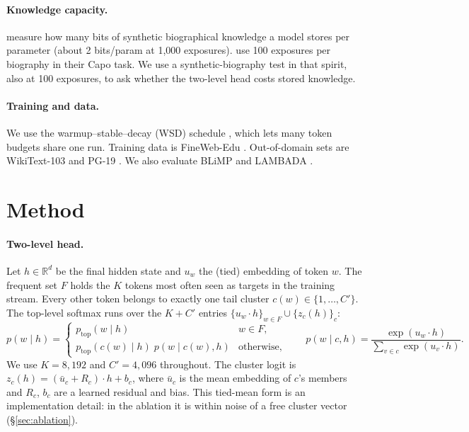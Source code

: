 \documentclass[11pt]{article}
\theoremstyle{remark}
\begin{document}
\paragraph{Knowledge capacity.} \citet{allenzhu2024physics33} measure how many bits of synthetic biographical knowledge a model
stores per parameter (about 2 bits/param at 1,000 exposures). \citet{allenzhu2025physics41} use 100 exposures per biography in
their Capo task. We use a synthetic-biography test in that spirit, also at 100 exposures, to ask whether the two-level head costs
stored knowledge.

\paragraph{Training and data.} We use the warmup--stable--decay (WSD) schedule \citep{hu2024minicpm}, which lets many token
budgets share one run. Training data is FineWeb-Edu \citep{penedo2024fineweb}. Out-of-domain sets are WikiText-103
\citep{merity2017pointer} and PG-19 \citep{rae2020compressive}. We also evaluate BLiMP \citep{warstadt2020blimp} and LAMBADA
\citep{paperno2016lambada}.

\section{Method}\label{sec:method}
\paragraph{Two-level head.} Let $h \in \mathbb{R}^d$ be the final hidden state and $u_w$ the (tied) embedding of token $w$. The
frequent set $F$ holds the $K$ tokens most often seen as targets in the training stream. Every other token belongs to exactly one
tail cluster $c(w) \in \{1, \dots, C'\}$. The top-level softmax runs over the $K + C'$ entries
$\{u_w \cdot h\}_{w \in F} \cup \{z_c(h)\}_c$:
\[ p(w \mid h) = \begin{cases} p_{\text{top}}(w \mid h) & w \in F,\\ p_{\text{top}}(c(w) \mid h)\; p(w \mid c(w), h) & \text{otherwise},\end{cases}
\qquad p(w \mid c, h) = \frac{\exp(u_w \cdot h)}{\sum_{v \in c} \exp(u_v \cdot h)}. \]
We use $K = 8{,}192$ and $C' = 4{,}096$ throughout. The cluster logit is $z_c(h) = (\bar u_c + R_c) \cdot h + b_c$, where
$\bar u_c$ is the mean embedding of $c$'s members and $R_c$, $b_c$ are a learned residual and bias. This tied-mean form is an
implementation detail: in the ablation it is within noise of a free cluster vector (\S\ref{sec:ablation}).
\end{document}
